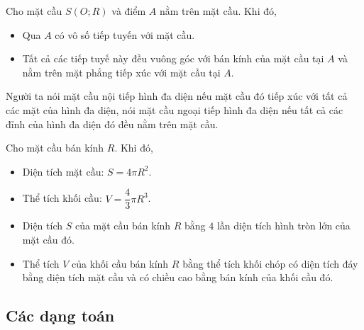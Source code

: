 \begin{dl}
	Cho mặt cầu $S(O;R)$ và điểm $A$ nằm trên mặt cầu. Khi đó,
	\begin{itemize}
		\item Qua $A$ có vô số tiếp tuyến với mặt cầu.
		\item Tất cả các tiếp tuyế này đều vuông góc với bán kính của mặt cầu tại $A$ và nằm trên mặt phẳng tiếp xúc với mặt cầu tại $A$.
	\end{itemize}
\end{dl}

\begin{note}
	Người ta nói mặt cầu nội tiếp hình đa diện nếu mặt cầu đó tiếp xúc với tất cả các mặt của hình đa diện, nói mặt cầu ngoại tiếp hình đa diện nếu tất cả các đỉnh của hình đa diện đó đều nằm trên mặt cầu.
\end{note}

\begin{tc}
	Cho mặt cầu bán kính $R$. Khi đó,
	\begin{itemize}
		\item Diện tích mặt cầu: $S=4\pi R^2$.
		\item Thể tích khối cầu: $V=\dfrac{4}{3}\pi R^3$.
	\end{itemize}
\end{tc}

\begin{note}
	\hfill
	\begin{itemize}
		\item Diện tích $S$ của mặt cầu bán kính $R$ bằng $4$ lần diện tích hình tròn lớn của mặt cầu đó.
		\item Thể tích $V$ của khối cầu bán kính $R$ bằng thể tích khối chóp có diện tích đáy bằng diện tích mặt cầu và có chiều cao bằng bán kính của khối cầu đó.
	\end{itemize}
\end{note}





\subsection{Các dạng toán}





